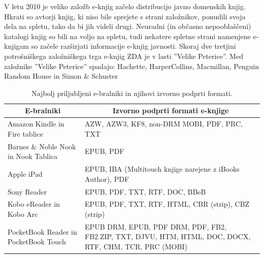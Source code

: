 \documentclass[a4paper, 12pt]{book}
\begin{document}
V letu 2010 je veliko založb e-knjig začelo distribucijo javno domenskih knjig. Hkrati so avtorji knjig, ki niso bile sprejete s strani založnikov,  ponudili svoja dela na spletu, tako da bi jih videli drugi. Neuradni (in občasno nepooblaščeni) katalogi knjig so bili na voljo na spletu, tudi nekatere spletne strani namenjene e-knjigam so začele razširjati informacije e-knjig javnosti. \cite{11} Skoraj dve tretjini potrošniškega založniškega trga e-knjig ZDA je v lasti ''Velike Peterice''. Med založnike ''Velike Peterice'' spadajo: Hachette, HarperCollins, Macmillan, Penguin Random House in Simon \& Schuster \cite{12}

\begin{table}[h]
	\begin{center}
		\begin{tabular}{ |p{5.5cm} | p{7.5cm}| }
			\hline
			\multicolumn{1}{|c|}{\textbf{E-bralniki}} & \multicolumn{1}{|c|}{\textbf{Izvorno podprti formati e-knjige}} \\ \hline
			Amazon Kindle in Fire tablice\cite{33} & AZW, AZW3, KF8, non-DRM MOBI, PDF, PRC, TXT \\ \hline
			Barnes \& Noble Nook in Nook Tablica\cite{34} & EPUB, PDF \\  \hline
			Apple iPad\cite{35} & EPUB, IBA (Multitouch knjige narejene z iBooks Author), PDF \\ \hline
			Sony Reader\cite{33} & EPUB, PDF, TXT, RTF, DOC, BBeB \\ \hline
			Kobo eReader in Kobo Arc\cite{36}\cite{37} & EPUB, PDF, TXT, RTF, HTML, CBR (strip), CBZ (strip) \\ \hline
			PocketBook Reader in PocketBook Touch\cite{38}\cite{39} & EPUB DRM, EPUB, PDF DRM, PDF, FB2, FB2.ZIP, TXT, DJVU, HTM, HTML, DOC, DOCX, RTF, CHM, TCR, PRC (MOBI) \\
			\hline
		\end{tabular}
	\end{center}
	\caption[E-bralniki in njihovi podprti formati.]{Najbolj priljubljeni e-bralniki \cite{32} in njihovi izvorno podprti formati.}
	\label{tbl:bralniki}
\end{table}
\end{document}
